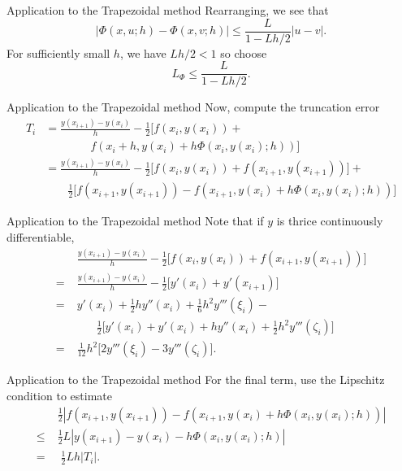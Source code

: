 \documentclass{beamer}
\begin{document}
    \begin{frame}{Application to the Trapezoidal method}
        Rearranging, we see that \[
           |\Phi(x, u; h) - \Phi(x, v; h)| \leq \frac{L}{1 - Lh / 2}|u - v|.
        \] For sufficiently small $h$, we have $Lh / 2 < 1$ so choose \[
            L_\Phi \leq \frac{L}{1 - Lh / 2}.
        \] 
    \end{frame}
    
    \begin{frame}{Application to the Trapezoidal method}
        Now, compute the truncation error
        \begin{align*}
            T_i &= \frac{y(x_{i + 1}) - y(x_i)}{h} - \frac{1}{2}\Big[f(x_i, y(x_i))
            + \\
            &\qquad\qquad f(x_i + h, y(x_i) + h\Phi(x_i, y(x_i); h))\Big] \\
            &= \frac{y(x_{i + 1}) - y(x_i)}{h} - \frac{1}{2}\Big[f(x_i, y(x_i)) +
            f(x_{i + 1}, y(x_{i + 1}))\Big] +  \\
            &\qquad \frac{1}{2}\Big[f(x_{i + 1}, y(x_{i + 1})) - f(x_{i + 1}, y(x_i) +
            h\Phi(x_i, y(x_i); h))\Big]
        \end{align*}
    \end{frame}
    
    \begin{frame}{Application to the Trapezoidal method}
        Note that if $y$ is thrice continuously differentiable,
        \begin{align*}
            &\;\frac{y(x_{i + 1}) - y(x_i)}{h} - \frac{1}{2}\Big[f(x_i, y(x_i)) + f(x_{i
            + 1}, y(x_{i + 1}))\Big] \\
            =&\; \frac{y(x_{i + 1}) - y(x_i)}{h} - \frac{1}{2}\Big[y'(x_i) + y'(x_{i +
            1})\Big] \\
            =&\; y'(x_i) + \frac{1}{2}hy''(x_i) + \frac{1}{6}h^2y'''(\xi_i) - \\
            &\qquad \frac{1}{2}\Big[y'(x_i) + y'(x_i) + hy''(x_i) +
            \frac{1}{2}h^2y'''(\zeta_i)\Big] \\
            =&\; \frac{1}{12}h^2\Big[2y'''(\xi_i) - 3y'''(\zeta_i)\Big].
        \end{align*}
    \end{frame}
    
    \begin{frame}{Application to the Trapezoidal method}
        For the final term, use the Lipschitz condition to estimate
        \begin{align*}
            &\frac{1}{2}|f(x_{i + 1}, y(x_{i + 1})) - f(x_{i + 1}, y(x_i) + h\Phi(x_i, y(x_i);
            h))| \\
            \leq\; &\frac{1}{2}L|y(x_{i + 1}) - y(x_i) - h\Phi(x_i, y(x_i); h)| \\
            =&\; \frac{1}{2}Lh|T_i|.
        \end{align*}
    \end{frame}
\end{document}
